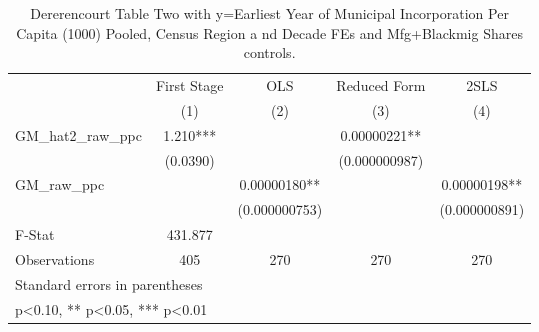 \begin{table}[htbp]\centering
\def\sym#1{\ifmmode^{#1}\else\(^{#1}\)\fi}
\caption{Dererencourt Table Two with y=Earliest Year of Municipal Incorporation Per Capita (1000) Pooled, Census Region a nd Decade FEs and Mfg+Blackmig Shares controls.}
\begin{tabular}{l*{4}{c}}
\toprule
                    & First Stage   &         OLS   &Reduced Form   &        2SLS   \\
                    &\multicolumn{1}{c}{(1)}   &\multicolumn{1}{c}{(2)}   &\multicolumn{1}{c}{(3)}   &\multicolumn{1}{c}{(4)}   \\
\midrule
GM\_hat2\_raw\_ppc     &       1.210***&               &  0.00000221** &               \\
                    &    (0.0390)   &               &(0.000000987)   &               \\
\addlinespace
GM\_raw\_ppc          &               &  0.00000180** &               &  0.00000198** \\
                    &               &(0.000000753)   &               &(0.000000891)   \\
\midrule
F-Stat              &     431.877   &               &               &               \\
Observations        &         405   &         270   &         270   &         270   \\
\bottomrule
\multicolumn{5}{l}{\footnotesize Standard errors in parentheses}\\
\multicolumn{5}{l}{\footnotesize * p<0.10, ** p<0.05, *** p<0.01}\\
\end{tabular}
\end{table}

